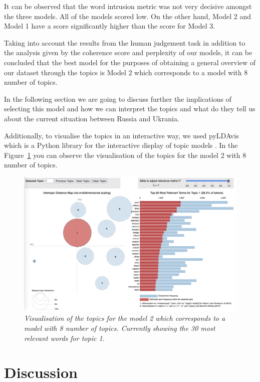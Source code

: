 \documentclass[twoside,12pt,a4paper]{article}
\begin{document}
\hfill \break
It can be observed that the word intrusion metric was not very decisive amongst the three models. All of the models scored low. On the other hand, Model 2 and Model 1 have a score significantly higher than the score for Model 3.

Taking into account the results from the human judgement task in addition to the analysis given by the coherence score and perplexity of our models, it can be concluded that the best model for the purposes of obtaining a general overview of our dataset through the topics is Model 2 which corresponds to a model with 8 number of topics.

In the following section we are going to discuss further the implications of selecting this model and how we can interpret the topics and what do they tell us about the current situation between Russia and Ukrania.

Additionally, to visualise the topics in an interactive way, we used pyLDAvis which is a Python library for the interactive display of topic models \citep{sievert_ldavis_2014}. In the Figure~\ref{fig:pyldavis} you can observe the visualisation of the topics for the model 2 with 8 number of topics.

\begin{figure}[h]
\centering
\includegraphics[scale=0.3]{pyldavis.png}
\caption{\textit{Visualisation of the topics for the model 2 which corresponds to a model with 8 number of topics. Currently showing the 30 most relevant words for topic 1.}}
\label{fig:pyldavis}
\end{figure}

\clearpage
\section{Discussion}
\end{document}
